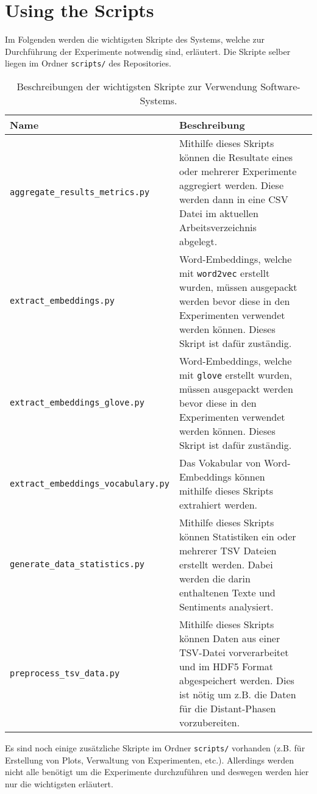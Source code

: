 \clearpage
\section{Using the Scripts}
Im Folgenden werden die wichtigsten Skripte des Systems, welche zur Durchführung der Experimente notwendig sind, erläutert. Die Skripte selber liegen im Ordner \texttt{scripts/} des Repositories.

\begin{table}[H]
	\centering
	\begin{adjustbox}{max width=\textwidth}
		\begin{tabular}{lp{8cm}p{8cm}}
			\toprule
			Name & Beschreibung\\ \midrule
			\texttt{aggregate{\_}results{\_}metrics.py} & Mithilfe dieses Skripts können die Resultate eines oder mehrerer Experimente aggregiert werden. Diese werden dann in eine CSV Datei im aktuellen Arbeitsverzeichnis abgelegt.\\
			\texttt{extract{\_}embeddings.py} & Word-Embeddings, welche mit \texttt{word2vec} erstellt wurden, müssen ausgepackt werden bevor diese in den Experimenten verwendet werden können. Dieses Skript ist dafür zuständig.\\
			\texttt{extract{\_}embeddings{\_}glove.py} & Word-Embeddings, welche mit \texttt{glove} erstellt wurden, müssen ausgepackt werden bevor diese in den Experimenten verwendet werden können. Dieses Skript ist dafür zuständig.\\
			\texttt{extract{\_}embeddings{\_}vocabulary.py} & Das Vokabular von Word-Embeddings können mithilfe dieses Skripts extrahiert werden.\\
			\texttt{generate{\_}data{\_}statistics.py} & Mithilfe dieses Skripts können Statistiken ein oder mehrerer TSV Dateien erstellt werden. Dabei werden die darin enthaltenen Texte und Sentiments analysiert.\\
			\texttt{preprocess{\_}tsv{\_}data.py} & Mithilfe dieses Skripts können Daten aus einer TSV-Datei vorverarbeitet und im HDF5 Format abgespeichert werden. Dies ist nötig um z.B. die Daten für die Distant-Phasen vorzubereiten.\\
			\bottomrule
		\end{tabular}
	\end{adjustbox}
	\caption{Beschreibungen der wichtigsten Skripte zur Verwendung Software-Systems.}
\end{table}

Es sind noch einige zusätzliche Skripte im Ordner \texttt{scripts/} vorhanden (z.B. für Erstellung von Plots, Verwaltung von Experimenten, etc.). Allerdings werden nicht alle benötigt um die Experimente durchzuführen und deswegen werden hier nur die wichtigsten erläutert.

